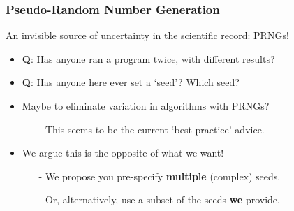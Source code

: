 \documentclass[12pt]{beamer}
\begin{document}
\begin{frame}
\frametitle{Pseudo-Random Number Generation}
An invisible source of uncertainty in the scientific record: PRNGs! \\ \vspace{.05in} \pause
	\begin{itemize}
		\item \textbf{Q}: Has anyone ran a program twice, with different results?\\ \vspace{.1in}\pause
		\item \textbf{Q}: Has anyone here ever set a `\color{myblue}seed\color{black}'? Which seed?\\ \vspace{.1in}\pause
		\item Maybe to eliminate variation in algorithms with PRNGs?\\ \vspace{.05in}
		\begin{itemize}
		\item[-] This seems to be the current `best practice' advice.\\ \vspace{.1in}  \pause
		\end{itemize}
			\item We argue this is the \color{myred}opposite of what we want\color{black}!\\ \vspace{.05in}
			\begin{itemize}
				\item[-] We propose you pre-specify \textbf{multiple} (complex) seeds.\\ \vspace{.05in} \pause
				\item[-] Or, alternatively, use a subset of the seeds \textbf{we} provide.
			\end{itemize}
	\end{itemize}
\end{frame}
\end{document}
